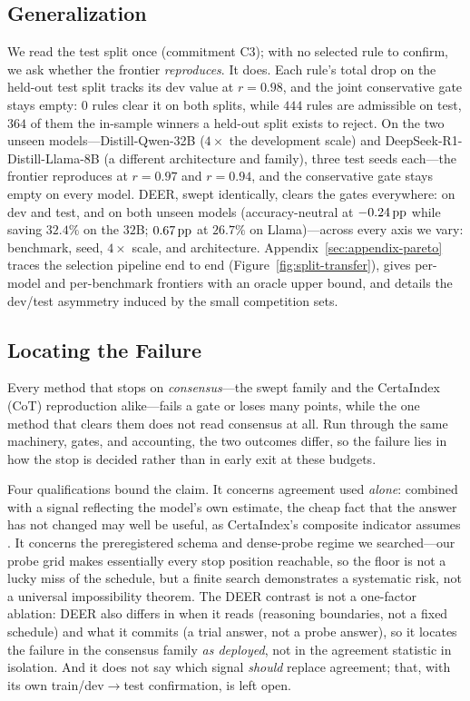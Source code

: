 \subsection{Generalization}
\label{sec:exp-heldout}
We read the test split once (commitment C3); with no selected rule to confirm,
we ask whether the frontier \emph{reproduces}. It does. Each rule's total drop
on the held-out test split tracks its dev value at $r{=}0.98$, and the joint
conservative gate stays empty: $0$ rules clear it on both splits, while $444$
rules are admissible on test, $364$ of them the in-sample winners a held-out
split exists to reject. On the two unseen
models---\mbox{Distill-Qwen-32B} ($4\times$ the development scale) and
\mbox{DeepSeek-R1-Distill-Llama-8B} (a different architecture and family),
three test seeds each---the frontier reproduces at $r{=}0.97$ and $r{=}0.94$,
and the conservative gate stays empty on every model. DEER, swept identically,
clears the gates everywhere: on dev and test, and on both unseen models
(accuracy-neutral at $-0.24\,\text{pp}$ while saving $32.4\%$ on the $32$B;
$0.67\,\text{pp}$ at $26.7\%$ on Llama)---across every axis we vary: benchmark, seed,
$4\times$ scale, and
architecture. Appendix~\ref{sec:appendix-pareto} traces the selection pipeline
end to end (Figure~\ref{fig:split-transfer}), gives per-model and per-benchmark
frontiers with an oracle upper bound, and details the dev/test asymmetry
induced by the small competition sets.

\subsection{Locating the Failure}
\label{sec:locating}
Every method that stops on \emph{consensus}---the swept family and the
CertaIndex (CoT) reproduction alike---fails a gate or loses many points, while
the one method that clears them does not read consensus at all. Run through the
same machinery, gates, and accounting, the two outcomes differ, so the failure
lies in how the stop is decided rather than in early exit at these budgets.

Four qualifications bound the claim. It concerns agreement used \emph{alone}:
combined with a signal reflecting the model's own estimate, the cheap fact that
the answer has not changed may well be useful, as CertaIndex's composite
indicator assumes \citep{dynasor_certaindex}. It concerns the preregistered schema and
dense-probe regime we searched---our probe grid makes essentially every stop
position reachable, so the floor is not a lucky miss of the schedule, but a
finite search demonstrates a systematic risk, not a universal impossibility
theorem. The DEER contrast is not a one-factor ablation: DEER also differs in
when it reads (reasoning boundaries, not a fixed schedule) and what it commits
(a trial answer, not a probe answer), so it locates the failure in the
consensus family \emph{as deployed}, not in the agreement statistic in
isolation. And it does not say which signal \emph{should} replace agreement;
that, with its own train/dev$\rightarrow$test confirmation, is left open.
